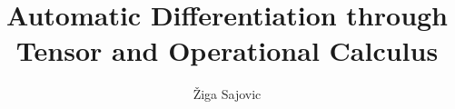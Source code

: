 
\title{Automatic Differentiation through Tensor and Operational Calculus}
\author[1]{Žiga Sajovic}
\date{}


\maketitle






